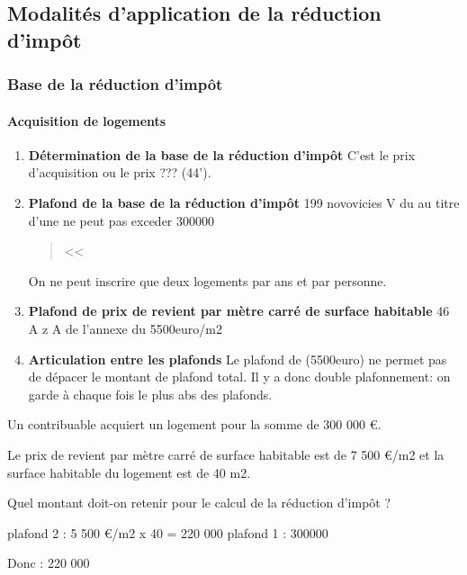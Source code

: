 	\subsection{Modalités d’application de la réduction d’impôt}

		\subsubsection{Base de la réduction d'impôt}

				\paragraph{Acquisition de logements}

					\begin{enumerate}[label=\alpha*.]
						\item \textbf{Détermination de la base de la réduction d'impôt} C'est le prix d'acquisition ou le prix ??? (44').
						\item \textbf{Plafond de la base de la réduction d'impôt} 199 novovicies V du \cgi au titre d'une ne peut pas exceder 300000
							\begin{quote}
								<<
							\end{quote}

							On ne peut inscrire que deux logements par ans et par personne.
						\item \textbf{Plafond de prix de revient par mètre carré de surface habitable} 46 A z A de l'annexe \III du \CGI 5500euro/m2

						\item \textbf{Articulation entre les plafonds} Le plafond de (5500euro) ne permet pas de dépacer le montant de plafond total. Il y a donc double plafonnement: on garde à chaque fois le plus abs des plafonds.
					\end{enumerate}

%
%
%

			\begin{casPratique}{%
				Un contribuable acquiert un logement pour la somme de 300 000 €.

				Le prix de revient par mètre carré de surface habitable est de 7 500 €/m2 et la surface habitable du logement est de 40 m2.

				Quel montant doit-on retenir pour le calcul de la réduction d’impôt ?
				}
				plafond 2 : 5 500 €/m2 x 40 = 220 000
				plafond 1  : 300000

				Donc : 220 000
			\end{casPratique}

